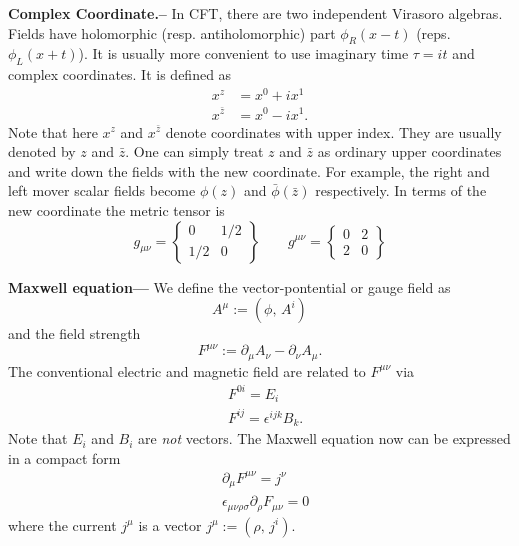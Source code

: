 \documentclass[submission, PhysLectNotes]{SciPost}
\begin{document}
{\bf Complex Coordinate.--}  In CFT, there are two independent Virasoro algebras. Fields have holomorphic (resp. antiholomorphic) part $\phi_R(x-t)$ (reps. $\phi_L(x+t)$). It is usually more convenient to use imaginary time $\tau = it$ and complex coordinates. It is defined as 
\begin{equation}
\begin{aligned}
x^z &= x^0 + i x^1 \\
x^{\bar{z}} &= x^0 - i x^1.
\end{aligned}
\end{equation}  
Note that here $x^z$ and $x^{\bar{z}}$ denote coordinates with upper index. They are usually denoted by $z$ and $\bar{z}$. One can simply treat $z$ and $\bar{z}$ as ordinary upper coordinates and write down the fields with the new coordinate. For example, the right and left mover scalar fields become $\phi(z)$ and $\bar{\phi}(\bar{z})$ respectively. In terms of the new coordinate the metric tensor is
\begin{equation}
	g_{\mu\nu} = \begin{Bmatrix}
        0    & 1/2  \\
        1/2  & 0     
    \end{Bmatrix} \qquad
	g^{\mu\nu} = \begin{Bmatrix}
        0 & 2  \\
        2 & 0
    \end{Bmatrix}
\end{equation}

{\bf Maxwell equation---}
We define the vector-pontential or gauge field as 
\begin{equation}
	A^\mu := (\phi,\, A^i)
\end{equation}
and the field strength
\begin{equation}
	F^{\mu\nu} := \partial_\mu A_\nu - \partial_\nu A_\mu.
\end{equation}
The conventional electric and magnetic field are related to $F^{\mu\nu}$ via
\begin{equation}
	\begin{aligned}
		&F^{0i} = E_i \\
		&F^{ij} = \epsilon^{ijk} B_k.
	\end{aligned}
\end{equation}
Note that $E_i$ and $B_i$ are {\it not} vectors. The Maxwell equation now can be expressed in a compact form 
\begin{equation}
	\begin{aligned}
		&\partial_\mu F^{\mu\nu} = j^\nu \\
		&\epsilon_{\mu\nu\rho\sigma}\partial_\rho F_{\mu\nu} =0 
	\end{aligned}
\end{equation}
where the current $j^\mu$ is a vector $j^\mu := (\rho,\,j^i)$.
\end{document}
